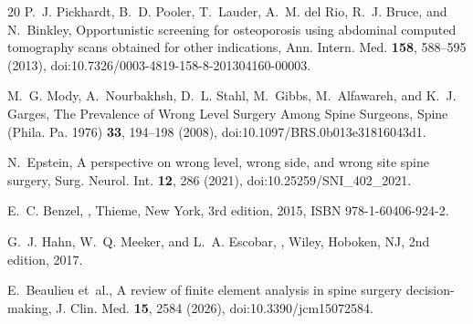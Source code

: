 \documentclass[aapm,mph,amsmath,amssymb,preprint,linenumbers]{revtex4-2}
\newif\ifcaptionlist \captionlisttrue
\newif\ifsupplement \supplementfalse
\begin{document}
\begin{thebibliography}{20}
P.~J. Pickhardt, B.~D. Pooler, T.~Lauder, A.~M. del Rio, R.~J. Bruce, and N.~Binkley,
\newblock Opportunistic screening for osteoporosis using abdominal computed tomography scans obtained for other indications,
\newblock Ann. Intern. Med. {\bf 158}, 588--595 (2013),
\newblock doi:10.7326/0003-4819-158-8-201304160-00003.

M.~G. Mody, A.~Nourbakhsh, D.~L. Stahl, M.~Gibbs, M.~Alfawareh, and K.~J. Garges,
\newblock The Prevalence of Wrong Level Surgery Among Spine Surgeons,
\newblock Spine (Phila. Pa. 1976) {\bf 33}, 194--198 (2008),
\newblock doi:10.1097/BRS.0b013e31816043d1.

N.~Epstein,
\newblock A perspective on wrong level, wrong side, and wrong site spine surgery,
\newblock Surg. Neurol. Int. {\bf 12}, 286 (2021),
\newblock doi:10.25259/SNI\_402\_2021.

E.~C. Benzel,
,
\newblock Thieme, New York, 3rd edition, 2015,
\newblock ISBN 978-1-60406-924-2.

G.~J. Hahn, W.~Q. Meeker, and L.~A. Escobar,
,
\newblock Wiley, Hoboken, NJ, 2nd edition, 2017.

E.~Beaulieu et~al.,
\newblock A review of finite element analysis in spine surgery decision-making,
\newblock J. Clin. Med. {\bf 15}, 2584 (2026),
\newblock doi:10.3390/jcm15072584.

\end{thebibliography}


\ifcaptionlist\fi

\ifsupplement
\clearpage
\onecolumngrid
\begin{center}{\large\bfseries Supporting Information}\end{center}

\fi
\end{document}
